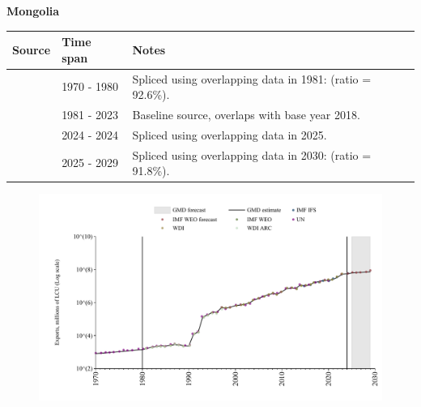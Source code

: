 \documentclass[12pt,a4paper,landscape]{article}
\begin{document}
\begin{adjustbox}{max totalsize={\paperwidth}{\paperheight},center}
\begin{minipage}[t][\textheight][t]{\textwidth}
\vspace*{0.5cm}
{}
\begin{center}
{\Large\bfseries Mongolia}
\end{center}
\vspace{0.5cm}
\begin{table}[H]
\centering
\small
\begin{tabular}{|l|l|l|}
\hline
\textbf{Source} & \textbf{Time span} & \textbf{Notes} \\
\hline
\rowcolor{white}\cite{UN}& 1970 - 1980 &Spliced using overlapping data in 1981: (ratio = 92.6\%).\\
\rowcolor{lightgray}\cite{WDI}& 1981 - 2023 &Baseline source, overlaps with base year 2018.\\
\rowcolor{white}\cite{IMF_IFS}& 2024 - 2024 &Spliced using overlapping data in 2025.\\
\rowcolor{lightgray}\cite{IMF_WEO_forecast}& 2025 - 2029 &Spliced using overlapping data in 2030: (ratio = 91.8\%).\\
\hline
\end{tabular}
\end{table}
\begin{figure}[H]
\centering
\includegraphics[width=\textwidth,height=0.6\textheight,keepaspectratio]{graphs/MNG_exports.pdf}
\end{figure}
\end{minipage}
\end{adjustbox}
\end{document}
